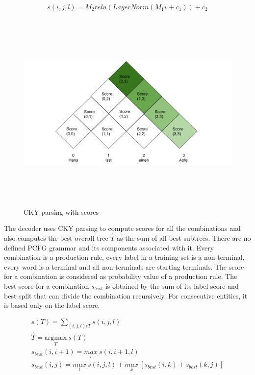 \documentclass[a4paper, 11pt]{article}
\begin{document}
\begin{align*}
s(i,j,l) = M_2relu(LayerNorm(M_1v + c_1)) + c_2
\end{align*}

\begin{figure}[H]
    \centering
    \includegraphics[width=\textwidth,height=10cm,keepaspectratio=true]
    {cky-parsing-chart-3.png}
    \caption{
        CKY parsing with scores
    }
    \label{fig:CKY}
\end{figure}

The decoder uses CKY parsing to compute scores for all the combinations and also computes the best overall tree $\hat{T}$ as the sum of all best subtrees. There are no defined PCFG grammar and its components associated with it. Every combination is a production rule, every label in a training set is a non-terminal, every word is a terminal and all non-terminals are starting terminals. The score for a combination is considered as probability value of a production rule. The best score for a combination $s_{best}$ is obtained by the sum of its label score and best split that can divide the combination recursively. For consecutive entities, it is based only on the label score.

\begin{align*}
s(T) = \sum_{(i,j,l) \epsilon T}s(i,j,l) \\
\hat{T} = \underset{T}{\mathrm{argmax}}\ s(T) \\
s_{best}(i,i+1) = \underset{l}{max}\ s(i,i+1,l) \\
s_{best}(i,j) = \underset{l}{max}\ s(i,j,l) + \underset{k}{max}\ {\left[s_{best}(i,k) + s_{best}(k,j)\right]}
\end{align*}
\end{document}

